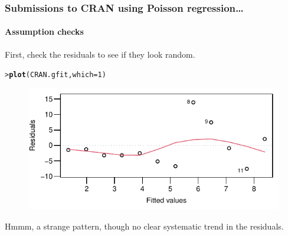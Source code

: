 \documentclass{beamer}\usepackage[]{graphicx}\usepackage[]{xcolor}
\makeatletter
\newcommand{\hlnum}[1]{\textcolor[rgb]{0.686,0.059,0.569}{#1}}%
\newcommand{\hlstd}[1]{\textcolor[rgb]{0.345,0.345,0.345}{#1}}%
\newcommand{\hlkwc}[1]{\textcolor[rgb]{0.333,0.667,0.333}{#1}}%
\newcommand{\hlkwd}[1]{\textcolor[rgb]{0.737,0.353,0.396}{\textbf{#1}}}%
\newenvironment{kframe}{%
 \def\at@end@of@kframe{}%
 \ifinner\ifhmode%
  \def\at@end@of@kframe{\end{minipage}}%
  \begin{minipage}{\columnwidth}%
 \fi\fi%
 \def\FrameCommand##1{\hskip\@totalleftmargin \hskip-\fboxsep
 \colorbox{shadecolor}{##1}\hskip-\fboxsep
     \hskip-\linewidth \hskip-\@totalleftmargin \hskip\columnwidth}%
 \MakeFramed {\advance\hsize-\width
   \@totalleftmargin\z@ \linewidth\hsize
   \@setminipage}}%
 {\par\unskip\endMakeFramed%
 \at@end@of@kframe}
\newenvironment{knitrout}{}{} %
\makeatother
\begin{document}
\begin{frame}[fragile]
\frametitle{Submissions to CRAN using Poisson regression\ldots}
\framesubtitle{Assumption checks}

\smallskip

First, check the residuals to see if they look random.

\begin{knitrout}\scriptsize
{}\color{fgcolor}\begin{kframe}
\begin{alltt}
\hlstd{> }\hlkwd{plot}\hlstd{(CRAN.gfit,} \hlkwc{which} \hlstd{=} \hlnum{1}\hlstd{)}
\end{alltt}
\end{kframe}
\end{knitrout}





\begin{figure}
  \centering
  \includegraphics{figure/RC-H13-022}
\end{figure}

Hmmm, a strange pattern, though no clear systematic trend in the residuals.

\end{frame}
\end{document}
